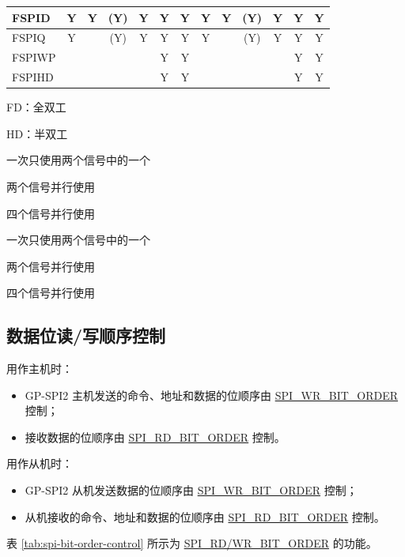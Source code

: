 \documentclass[main\_\_CN.tex]{subfiles}
\begin{document}
\begin{landscape}
\begin{table}[H]
\begin{threeparttable}
\begin{tabular}{ |p{2.0cm} |c|c|c|c|c|c|c|c|c|c|c|c| }
FSPID                    & Y       & Y       & (Y)\tnote{3}      & Y\tnote{4}      & Y\tnote{5}      & Y      & Y       & Y      & (Y)\tnote{6}      & Y\tnote{7}     & Y\tnote{8}     & Y      \\ \hline
FSPIQ                    & Y       &         & (Y)\tnote{3}      & Y\tnote{4}      & Y\tnote{5}      & Y      & Y       &        & (Y)\tnote{6}     & Y\tnote{7}     & Y\tnote{8}      & Y      \\ \hline
FSPIWP                   &         &         &         &         & Y\tnote{5}      & Y      &         &        &         &         & Y\tnote{8}       & Y      \\ \hline
FSPIHD                   &         &         &         &         & Y\tnote{5}      & Y      &         &        &         &         & Y\tnote{8}       & Y      \\ \hline
\end{tabular}

        \begin{tablenotes}
            \item[1] FD：全双工
            \item[2] HD：半双工
            \item[3] 一次只使用两个信号中的一个
            \item[4] 两个信号并行使用
            \item[5] 四个信号并行使用
            \item[6] 一次只使用两个信号中的一个
            \item[7] 两个信号并行使用
            \item[8] 四个信号并行使用
        \end{tablenotes}
     \end{threeparttable}
    \end{table}
\end{landscape}

\subsection{数据位读/写顺序控制}
用作主机时：
\begin{itemize}
    \item GP-SPI2 主机发送的命令、地址和数据的位顺序由 \hyperref[fielddesc:SPIWRBITORDER]{SPI\_WR\_BIT\_ORDER} 控制；
    \item 接收数据的位顺序由 \hyperref[fielddesc:SPIRDBITORDER]{SPI\_RD\_BIT\_ORDER} 控制。
\end{itemize}   
用作从机时：
\begin{itemize}
    \item GP-SPI2 从机发送数据的位顺序由 \hyperref[fielddesc:SPIWRBITORDER]{SPI\_WR\_BIT\_ORDER} 控制； 
    \item 从机接收的命令、地址和数据的位顺序由 \hyperref[fielddesc:SPIRDBITORDER]{SPI\_RD\_BIT\_ORDER} 控制。 
\end{itemize}  
表 \ref{tab:spi-bit-order-control} 所示为 \hyperref[fielddesc:SPIRDBITORDER]{SPI\_RD/WR\_BIT\_ORDER} 的功能。
\end{document}
